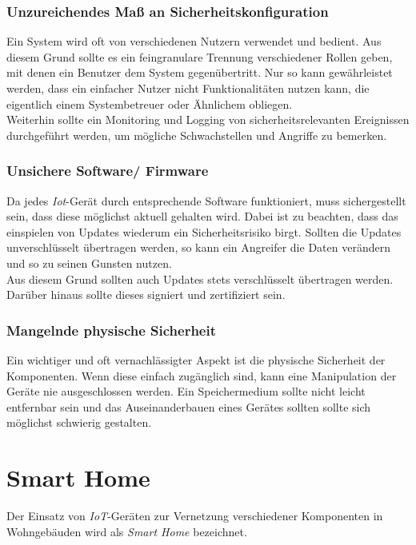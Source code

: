 \documentclass[conference]{IEEEtran}
\begin{document}
\subsubsection{Unzureichendes Maß an Sicherheitskonfiguration}
Ein System wird oft von verschiedenen Nutzern verwendet und bedient. Aus diesem Grund sollte es ein feingranulare Trennung verschiedener Rollen geben, mit denen ein Benutzer dem System gegenübertritt. Nur so kann gewährleistet werden, dass ein einfacher Nutzer nicht Funktionalitäten nutzen kann, die eigentlich einem Systembetreuer oder Ähnlichem obliegen. \\
Weiterhin sollte ein Monitoring und Logging von sicherheitsrelevanten Ereignissen durchgeführt werden, um mögliche Schwachstellen und Angriffe zu bemerken\cite{owasp}. 
\subsubsection{Unsichere Software/ Firmware}
Da jedes \textit{Iot}-Gerät durch entsprechende Software funktioniert, muss sichergestellt sein, dass diese möglichst aktuell gehalten wird. Dabei ist zu beachten, dass das einspielen von Updates wiederum ein Sicherheitsrisiko birgt. Sollten die Updates unverschlüsselt übertragen werden, so kann ein Angreifer die Daten verändern und so zu seinen Gunsten nutzen\cite{owasp}. \\
Aus diesem Grund sollten auch Updates stets verschlüsselt übertragen werden. Darüber hinaus sollte dieses signiert und zertifiziert sein.
\subsubsection{Mangelnde physische Sicherheit}
Ein wichtiger und oft vernachlässigter Aspekt ist die physische Sicherheit der Komponenten. Wenn diese einfach zugänglich sind, kann eine Manipulation der Geräte nie ausgeschlossen werden. Ein Speichermedium sollte nicht leicht entfernbar sein und das Auseinanderbauen eines Gerätes sollten sollte sich möglichst schwierig gestalten\cite{owasp}.\\

\section{Smart Home}
Der Einsatz von \textit{IoT}-Geräten zur Vernetzung verschiedener Komponenten in Wohngebäuden wird als \textit{Smart Home} bezeichnet\cite{andelf}. 
\end{document}
